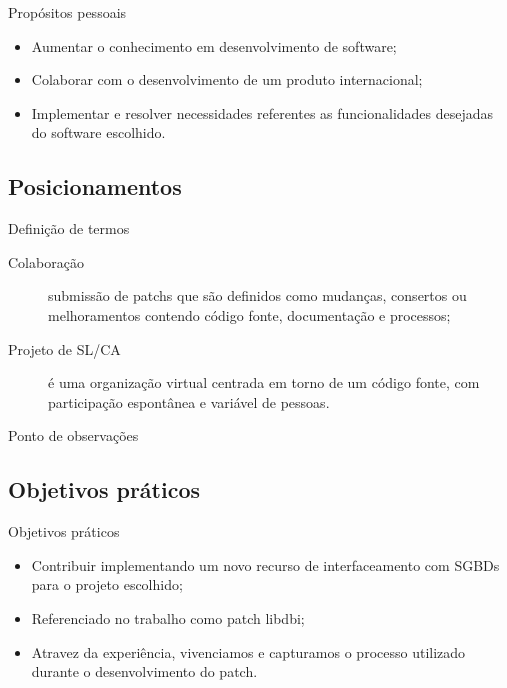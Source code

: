 \begin{frame}{Propósitos pessoais}
 \begin{itemize}
 \item <1-> Aumentar o conhecimento em desenvolvimento de software;
 \item <2-> Colaborar com o desenvolvimento de um produto internacional;
 \item <3-> Implementar e resolver necessidades referentes as funcionalidades desejadas do software escolhido.
 \end{itemize}
\end{frame}

\subsection{Posicionamentos}
 \begin{frame}{Definição de termos}
  \begin{description}
   \item [Colaboração] submissão de patchs que são definidos como mudanças, consertos ou melhoramentos contendo código fonte, documentação e processos;
   \item [Projeto de SL/CA] é uma organização virtual centrada em torno de um código fonte, com participação espontânea e variável de pessoas.
  \end{description}
 \end{frame}

 \begin{frame}{Ponto de observações}
   \begin{center}
   \end{center}
 \end{frame}

\subsection{Objetivos práticos}
  \begin{frame}{Objetivos práticos} 
    \begin{itemize}
      \item Contribuir implementando um novo recurso de interfaceamento com SGBDs para o projeto escolhido;
      \item Referenciado no trabalho como patch libdbi;
      \item Atravez da experiência, vivenciamos e capturamos o processo utilizado durante o desenvolvimento do patch.
    \end{itemize}
  \end{frame}

